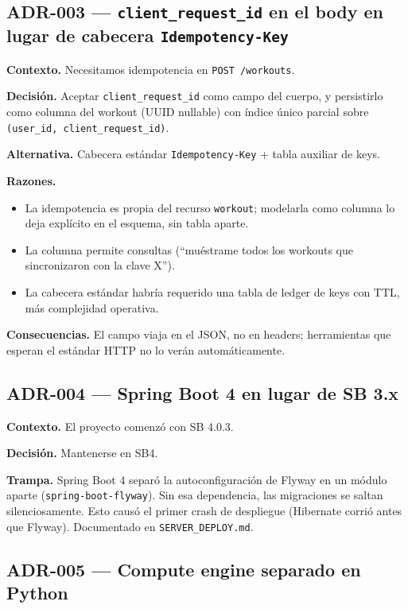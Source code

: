\documentclass[11pt,a4paper]{article}
\begin{document}
\subsection{ADR-003 — \texttt{client\_request\_id} en el body en lugar de cabecera \texttt{Idempotency-Key}}

\textbf{Contexto.} Necesitamos idempotencia en \texttt{POST /workouts}.

\textbf{Decisión.} Aceptar \texttt{client\_request\_id} como campo del cuerpo, y persistirlo como columna del workout (UUID nullable) con índice único parcial sobre \texttt{(user\_id, client\_request\_id)}.

\textbf{Alternativa.} Cabecera estándar \texttt{Idempotency-Key} + tabla auxiliar de keys.

\textbf{Razones.}
\begin{itemize}[leftmargin=*]
  \item La idempotencia es propia del recurso \texttt{workout}; modelarla como columna lo deja explícito en el esquema, sin tabla aparte.
  \item La columna permite consultas (``muéstrame todos los workouts que sincronizaron con la clave X'').
  \item La cabecera estándar habría requerido una tabla de ledger de keys con TTL, más complejidad operativa.
\end{itemize}

\textbf{Consecuencias.} El campo viaja en el JSON, no en headers; herramientas que esperan el estándar HTTP no lo verán automáticamente.

\subsection{ADR-004 — Spring Boot 4 en lugar de SB 3.x}

\textbf{Contexto.} El proyecto comenzó con SB 4.0.3.

\textbf{Decisión.} Mantenerse en SB4.

\textbf{Trampa.} Spring Boot 4 separó la autoconfiguración de Flyway en un módulo aparte (\texttt{spring-boot-flyway}). Sin esa dependencia, las migraciones se saltan silenciosamente. Esto causó el primer crash de despliegue (Hibernate corrió antes que Flyway). Documentado en \texttt{SERVER\_DEPLOY.md}.

\subsection{ADR-005 — Compute engine separado en Python}
\end{document}
